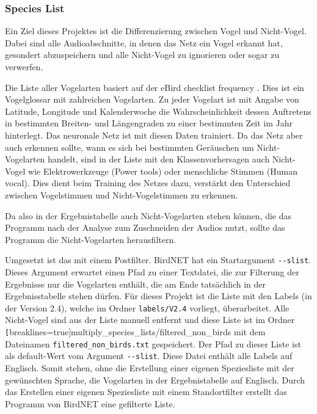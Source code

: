 \subsubsection{Species List}
\label{subsubsec:speiceslist}

Ein Ziel dieses Projektes ist die Differenzierung zwischen Vogel und Nicht-Vogel. Dabei sind alle Audioabschnitte, in denen das Netz ein Vogel erkannt hat, gesondert abzuspeichern und alle Nicht-Vogel zu ignorieren oder sogar zu verwerfen.


Die Liste aller Vogelarten basiert auf der eBird checklist frequency \cite{bird-glossary}. %
Dies ist ein Vogelglossar mit zahlreichen Vogelarten. Zu jeder Vogelart ist mit Angabe von Latitude, Longitude und Kalenderwoche die Wahrscheinlichkeit dessen Auftretens in bestimmten Breiten- und Längengraden zu einer bestimmten Zeit im Jahr hinterlegt. 
Das neuronale Netz ist mit diesen Daten trainiert. Da das Netz aber auch erkennen sollte, wann es sich bei bestimmten Geräuschen um Nicht-Vogelarten handelt, sind in der Liste mit den Klassenvorhersagen auch Nicht-Vogel wie Elektrowerkzeuge  (Power tools) oder menschliche Stimmen (Human vocal). 
Dies dient beim Training des Netzes dazu, verstärkt den Unterschied zwischen Vogelstimmen und Nicht-Vogelstimmen zu erkennen.

Da also in der Ergebnistabelle auch Nicht-Vogelarten stehen können, die das Programm nach der Analyse zum Zuschneiden der Audios nutzt, sollte das Programm die Nicht-Vogelarten herausfiltern.

Umgesetzt ist das mit einem Postfilter. BirdNET hat ein Startargument \texttt{-{}-slist}. Dieses Argument erwartet einen Pfad zu einer Textdatei, die zur Filterung der Ergebnisse nur die Vogelarten enthält, die am Ende tatsächlich in der Ergebnisstabelle stehen dürfen. 
Für dieses Projekt ist die Liste mit den Labels (in der Version 2.4), welche im Ordner \texttt{labels/V2.4} vorliegt,
überarbeitet. Alle Nicht-Vogel sind aus der Liste manuell entfernt und diese Liste ist im Ordner \texttt[breaklines=true]{multiply\_species\_lists/filtered\_non\_birds} mit dem Dateinamen \texttt{filtered\_non\_birds.txt} gespeichert. 
Der Pfad zu dieser Liste ist als default-Wert vom Argument \texttt{-{}-slist}. Diese Datei enthält alle Labels auf Englisch. Somit stehen, ohne die Erstellung einer eigenen Speziesliste mit der gewünschten Sprache, die Vogelarten in der Ergebnistabelle auf Englisch.
Durch das Erstellen einer eigenen Speziesliste mit einem Standortfilter erstellt das Programm  von BirdNET eine gefilterte Liste.


